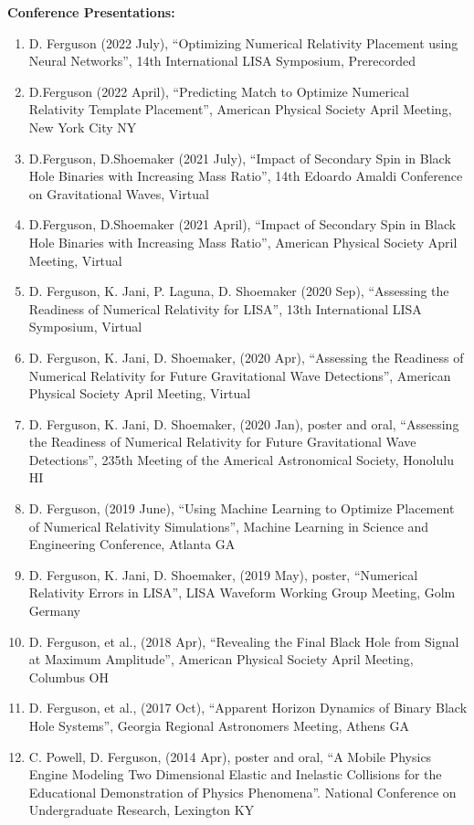 \documentclass[11pt]{article}
\begin{document}
\begin{flushleft}
  \textbf{Conference Presentations:}
  \begin{enumerate}
  \item D. Ferguson (2022 July), ``Optimizing Numerical Relativity Placement using Neural Networks'', 14th International LISA Symposium, Prerecorded
  \item D.Ferguson (2022 April), ``Predicting Match to Optimize Numerical Relativity Template Placement'', American Physical Society April Meeting, New York City NY
  \item D.Ferguson, D.Shoemaker (2021 July), ``Impact of Secondary Spin in Black Hole Binaries with Increasing Mass Ratio'', 14th Edoardo Amaldi Conference on Gravitational Waves, Virtual
  \item D.Ferguson,  D.Shoemaker (2021 April), ``Impact of Secondary Spin in Black Hole Binaries with Increasing Mass Ratio'',  American Physical Society April Meeting, Virtual
  \item D. Ferguson, K. Jani, P. Laguna, D. Shoemaker (2020 Sep), ``Assessing the Readiness of Numerical Relativity for LISA'', 13th International LISA Symposium, Virtual
  \item D. Ferguson, K. Jani, D. Shoemaker, (2020 Apr), ``Assessing the Readiness of Numerical Relativity for Future Gravitational Wave Detections'', American Physical Society April Meeting, Virtual
  \item D. Ferguson, K. Jani, D. Shoemaker, (2020 Jan), poster and oral, ``Assessing the Readiness of Numerical Relativity for Future Gravitational Wave Detections'', 235th Meeting of the Americal Astronomical Society, Honolulu HI
  \item D. Ferguson, (2019 June), ``Using Machine Learning to Optimize Placement of Numerical Relativity Simulations'', Machine Learning in Science and Engineering Conference, Atlanta GA
  \item D. Ferguson, K. Jani, D. Shoemaker, (2019 May), poster, ``Numerical Relativity Errors in LISA'', LISA Waveform Working Group Meeting, Golm Germany
  \item D. Ferguson, et al., (2018 Apr), ``Revealing the Final Black Hole from Signal at Maximum Amplitude'', American Physical Society April Meeting, Columbus OH
  \item D. Ferguson, et al., (2017 Oct), ``Apparent Horizon Dynamics of Binary Black Hole Systems'', Georgia Regional Astronomers Meeting, Athens GA
  \item C. Powell, D. Ferguson, (2014 Apr), poster and oral, ``A Mobile Physics Engine Modeling Two Dimensional Elastic and Inelastic Collisions for the Educational Demonstration of Physics Phenomena''. National Conference on Undergraduate Research, Lexington KY  
  \end{enumerate} 


\end{flushleft}
\end{document}
